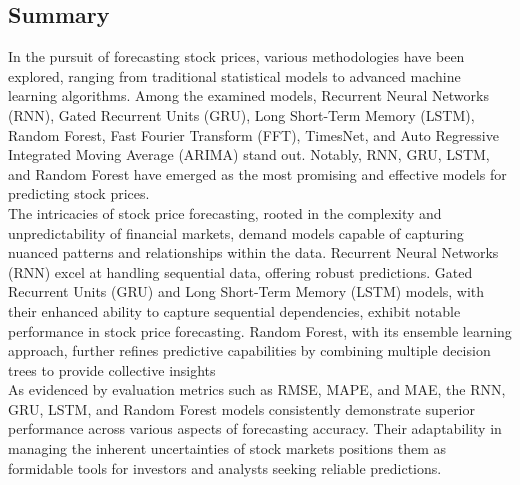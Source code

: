 \documentclass{ieeeojies}
\begin{document}
\subsection{Summary}
In the pursuit of forecasting stock prices, various methodologies have been explored, ranging from traditional statistical models to advanced machine learning algorithms. Among the examined models, Recurrent Neural Networks (RNN), Gated Recurrent Units (GRU), Long Short-Term Memory (LSTM), Random Forest, Fast Fourier Transform (FFT), TimesNet, and Auto Regressive Integrated Moving Average (ARIMA) stand out. Notably, RNN, GRU, LSTM, and Random Forest have emerged as the most promising and effective models for predicting stock prices.\\
The intricacies of stock price forecasting, rooted in the complexity and unpredictability of financial markets, demand models capable of capturing nuanced patterns and relationships within the data. Recurrent Neural Networks (RNN) excel at handling sequential data, offering robust predictions. Gated Recurrent Units (GRU) and Long Short-Term Memory (LSTM) models, with their enhanced ability to capture sequential dependencies, exhibit notable performance in stock price forecasting. Random Forest, with its ensemble learning approach, further refines predictive capabilities by combining multiple decision trees to provide collective insights\\
As evidenced by evaluation metrics such as RMSE, MAPE, and MAE, the RNN, GRU, LSTM, and Random Forest models consistently demonstrate superior performance across various aspects of forecasting accuracy. Their adaptability in managing the inherent uncertainties of stock markets positions them as formidable tools for investors and analysts seeking reliable predictions.\\
\end{document}
